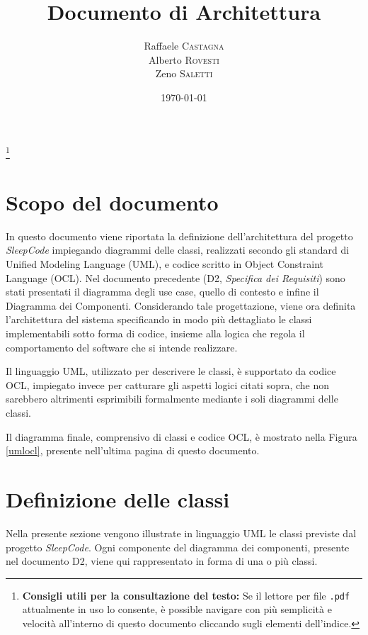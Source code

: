 \documentclass[11pt, a4paper]{article}
\title{Documento di Architettura}
\author{Raffaele \textsc{Castagna}\\
Alberto \textsc{Rovesti}\\
Zeno \textsc{Saletti}}
\date{\today}
\theoremstyle{definition} %
\newcommand\blfootnote[1]{%
  \begingroup
  \renewcommand\thefootnote{}\footnote{#1}%
  \addtocounter{footnote}{-1}%
  \endgroup
}
\begin{document}


\tableofcontents\blfootnote{\textbf{Consigli utili per la consultazione del testo:} Se il lettore per file \texttt{.pdf} attualmente in uso lo consente, è possible navigare con più semplicità e velocità all'interno di questo documento cliccando sugli elementi dell'indice.}

\newpage

\section*{Scopo del documento}
In questo documento viene riportata la definizione dell'architettura del
progetto \textit{SleepCode} impiegando diagrammi delle classi, realizzati
secondo gli standard di Unified Modeling Language (UML), e codice scritto in Object
Constraint Language (OCL). Nel documento precedente (D2, \textit{Specifica
dei Requisiti}) sono stati presentati il diagramma degli use case, quello
di contesto e infine il Diagramma dei Componenti. Considerando tale
progettazione, viene ora definita l'architettura del sistema specificando
in modo più dettagliato le classi implementabili sotto forma di
codice, insieme alla logica che regola il comportamento del software che
si intende realizzare.

Il linguaggio UML, utilizzato per descrivere le classi, è supportato da
codice OCL, impiegato invece per catturare gli aspetti logici citati sopra,
che non sarebbero altrimenti esprimibili formalmente mediante i soli diagrammi delle
classi.

Il diagramma finale, comprensivo di classi e codice OCL, è mostrato nella
Figura \ref{umlocl}, presente nell'ultima pagina di questo documento.


\newpage
\section{Definizione delle classi}
Nella presente sezione vengono illustrate in linguaggio UML le classi
previste dal progetto \textit{SleepCode}. Ogni componente del diagramma
dei componenti, presente nel documento D2, viene qui rappresentato
in forma di una o più classi.

\end{document}
